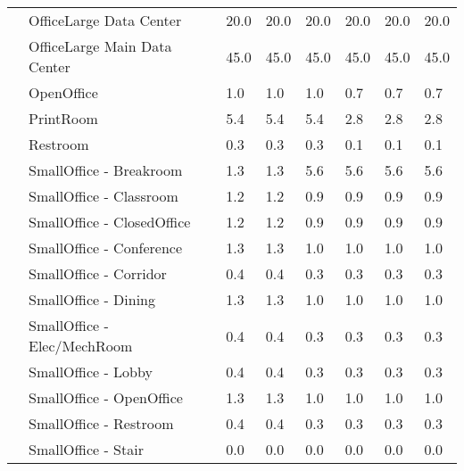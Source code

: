 \begin{center}
\begin{longtable}{p{1.25in}p{1in}p{0.5in}p{0.5in}p{0.5in}p{0.5in}p{0.5in}p{0.5in}}
                                   & OfficeLarge Data Center              & 20.0    & 20.0    & 20.0   & 20.0  & 20.0  & 20.0   \\
                                   & OfficeLarge Main Data Center         & 45.0    & 45.0    & 45.0   & 45.0  & 45.0  & 45.0   \\
                                   & OpenOffice                           & 1.0     & 1.0     & 1.0    & 0.7   & 0.7   & 0.7    \\
                                   & PrintRoom                            & 5.4     & 5.4     & 5.4    & 2.8   & 2.8   & 2.8    \\
                                   & Restroom                             & 0.3     & 0.3     & 0.3    & 0.1   & 0.1   & 0.1    \\
                                   & SmallOffice - Breakroom              & 1.3     & 1.3     & 5.6    & 5.6   & 5.6   & 5.6    \\
                                   & SmallOffice - Classroom              & 1.2     & 1.2     & 0.9    & 0.9   & 0.9   & 0.9    \\
                                   & SmallOffice - ClosedOffice           & 1.2     & 1.2     & 0.9    & 0.9   & 0.9   & 0.9    \\
                                   & SmallOffice - Conference             & 1.3     & 1.3     & 1.0    & 1.0   & 1.0   & 1.0    \\
                                   & SmallOffice - Corridor               & 0.4     & 0.4     & 0.3    & 0.3   & 0.3   & 0.3    \\
                                   & SmallOffice - Dining                 & 1.3     & 1.3     & 1.0    & 1.0   & 1.0   & 1.0    \\
                                   & SmallOffice - Elec/MechRoom          & 0.4     & 0.4     & 0.3    & 0.3   & 0.3   & 0.3    \\
                                   & SmallOffice - Lobby                  & 0.4     & 0.4     & 0.3    & 0.3   & 0.3   & 0.3    \\
                                   & SmallOffice - OpenOffice             & 1.3     & 1.3     & 1.0    & 1.0   & 1.0   & 1.0    \\
                                   & SmallOffice - Restroom               & 0.4     & 0.4     & 0.3    & 0.3   & 0.3   & 0.3    \\
                                   & SmallOffice - Stair                  & 0.0     & 0.0     & 0.0    & 0.0   & 0.0   & 0.0    \\

\end{longtable}
\end{center}
